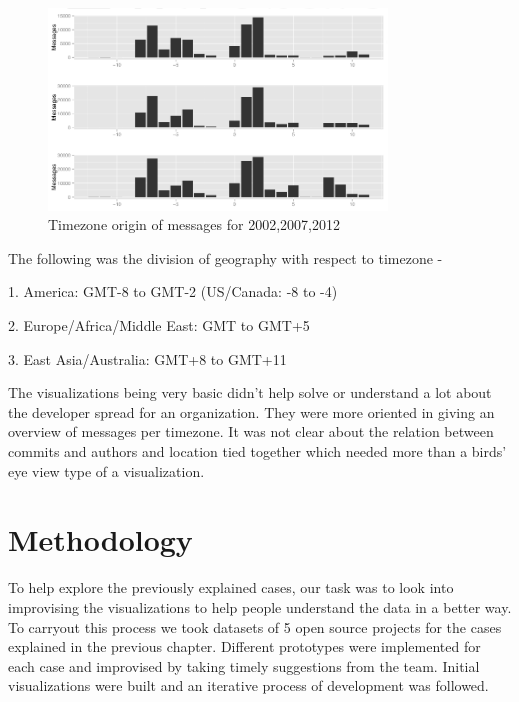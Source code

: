 \documentclass[seploa]{beavtex}
\begin{document}
\begin{figure}[!ht]
\centering
\includegraphics[width=90mm]{work2.png}
\caption{Timezone origin of messages for 2002,2007,2012}
\end{figure}

The following was the division of geography with respect to timezone -

1. America: GMT-8 to GMT-2 (US/Canada: -8 to -4)

2. Europe/Africa/Middle East: GMT to GMT+5

3. East Asia/Australia: GMT+8 to GMT+11


The visualizations being very basic didn't help solve or understand a lot about the developer spread for an organization. They were more oriented in giving an overview of messages per timezone. It was not clear about the relation between commits and authors and location tied together which needed more than a birds' eye view type of a visualization. 


\chapter{Methodology}
To help explore the previously explained cases, our task was to look into improvising the visualizations to help people understand the data in a better way. To carryout this process we took datasets of 5 open source projects for the cases explained in the previous chapter. Different prototypes were implemented for each case and improvised by taking timely suggestions from the team. Initial visualizations were built and an iterative process of development was followed.
\end{document}
